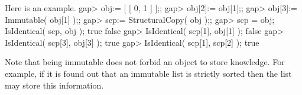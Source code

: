 Here is an example.
\beginexample
    gap> obj:= [ [ 0, 1 ] ];;
    gap> obj[2]:= obj[1];;
    gap> obj[3]:= Immutable( obj[1] );;
    gap> scp:= StructuralCopy( obj );;
    gap> scp = obj; IsIdentical( scp, obj );
    true
    false
    gap> IsIdentical( scp[1], obj[1] );
    false
    gap> IsIdentical( scp[3], obj[3] );
    true
    gap> IsIdentical( scp[1], scp[2] );
    true
\endexample

Note that being immutable does not forbid an object to store knowledge.
For example, if it is found out that an immutable list is strictly
sorted then the list may store this information.

